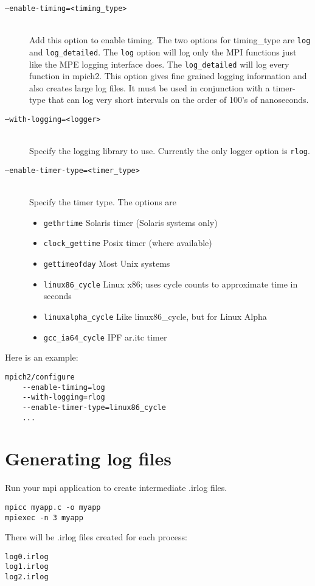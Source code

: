 \documentclass[dvipdfm,11pt]{article}
\begin{document}
\begin{description}
\item[\texttt{--enable-timing=<timing\_type>}]\mbox{}\\
Add this option to enable timing.  The two options for timing\_type are \texttt{log}
and \texttt{log\_detailed}.  The \texttt{log} option will log only the MPI functions just
like the MPE logging interface does.  The \texttt{log\_detailed} will log every
function in mpich2.  This option gives fine grained logging information and
also creates large log files.  It must be used in conjunction with a timer-type that
can log very short intervals on the order of 100's of nanoseconds.

\item[\texttt{--with-logging=<logger>}]\mbox{}\\
Specify the logging library to use.  Currently the only logger option is \texttt{rlog}.

\item[\texttt{--enable-timer-type=<timer\_type>}]\mbox{}\\
Specify the timer type.  The options are
\begin{itemize}
\item \texttt{gethrtime}
Solaris timer (Solaris systems only)
\item \texttt{clock\_gettime}
Posix timer (where available)
\item \texttt{gettimeofday}
Most Unix systems
\item \texttt{linux86\_cycle}
Linux x86; uses cycle counts to approximate time in seconds
\item \texttt{linuxalpha\_cycle}
Like linux86\_cycle, but for Linux Alpha
\item \texttt{gcc\_ia64\_cycle}
IPF ar.itc timer
\end{itemize}
\end{description}

Here is an example:
\begin{verbatim}
mpich2/configure
    --enable-timing=log
    --with-logging=rlog
    --enable-timer-type=linux86_cycle
    ...
\end{verbatim}

\section{Generating log files}
\label{sec:genlogs}
Run your mpi application to create intermediate .irlog files.

\begin{verbatim}
mpicc myapp.c -o myapp
mpiexec -n 3 myapp
\end{verbatim}
There will be .irlog files created for each process:
\begin{verbatim}
log0.irlog
log1.irlog
log2.irlog
\end{verbatim}
\end{document}
